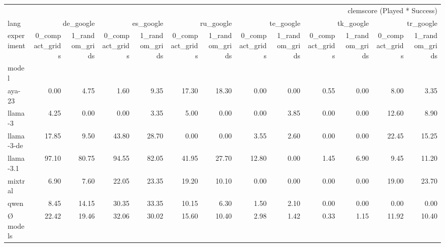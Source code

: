 \begin{tabular}{lrrrrrrrrrrrr}
\toprule
 & \multicolumn{12}{r}{clemscore (Played * Success)} \\
lang & \multicolumn{2}{r}{de_google} & \multicolumn{2}{r}{es_google} & \multicolumn{2}{r}{ru_google} & \multicolumn{2}{r}{te_google} & \multicolumn{2}{r}{tk_google} & \multicolumn{2}{r}{tr_google} \\
experiment & 0_compact_grids & 1_random_grids & 0_compact_grids & 1_random_grids & 0_compact_grids & 1_random_grids & 0_compact_grids & 1_random_grids & 0_compact_grids & 1_random_grids & 0_compact_grids & 1_random_grids \\
model &  &  &  &  &  &  &  &  &  &  &  &  \\
\midrule
aya-23 & 0.00 & 4.75 & 1.60 & 9.35 & 17.30 & 18.30 & 0.00 & 0.00 & 0.55 & 0.00 & 8.00 & 3.35 \\
llama-3 & 4.25 & 0.00 & 0.00 & 3.35 & 5.00 & 0.00 & 0.00 & 3.85 & 0.00 & 0.00 & 12.60 & 8.90 \\
llama-3-de & 17.85 & 9.50 & 43.80 & 28.70 & 0.00 & 0.00 & 3.55 & 2.60 & 0.00 & 0.00 & 22.45 & 15.25 \\
llama-3.1 & 97.10 & 80.75 & 94.55 & 82.05 & 41.95 & 27.70 & 12.80 & 0.00 & 1.45 & 6.90 & 9.45 & 11.20 \\
mixtral & 6.90 & 7.60 & 22.05 & 23.35 & 19.20 & 10.10 & 0.00 & 0.00 & 0.00 & 0.00 & 19.00 & 23.70 \\
qwen & 8.45 & 14.15 & 30.35 & 33.35 & 10.15 & 6.30 & 1.50 & 2.10 & 0.00 & 0.00 & 0.00 & 0.00 \\
Ø models & 22.42 & 19.46 & 32.06 & 30.02 & 15.60 & 10.40 & 2.98 & 1.42 & 0.33 & 1.15 & 11.92 & 10.40 \\
\bottomrule
\end{tabular}
